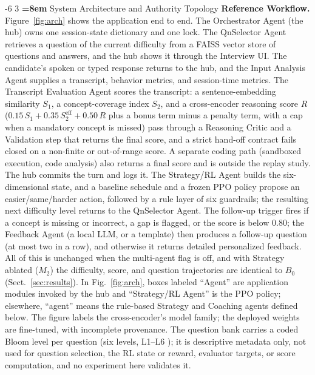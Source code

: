\documentclass[runningheads,a4paper]{llncs}
\makeatletter
\renewcommand\section{\@startsection{section}{1}{\z@}%
                       {-6\p@ \@plus -1\p@ \@minus -1\p@}%
                       {3\p@ \@plus 1\p@ \@minus 1\p@}%
                       {\normalfont\large\bfseries\boldmath
                        \rightskip=\z@ \@plus 8em\pretolerance=10000 }}
\makeatother
\begin{document}
\section{System Architecture and Authority Topology}
\textbf{Reference Workflow.} Figure~\ref{fig:arch} shows the application end to end. The Orchestrator Agent (the hub) owns one session-state dictionary and one lock. The QnSelector Agent retrieves a question of the current difficulty from a FAISS vector store of questions and answers, and the hub shows it through the Interview UI. The candidate's spoken or typed response returns to the hub, and the Input Analysis Agent supplies a transcript, behavior metrics, and session-time metrics. The Transcript Evaluation Agent scores the transcript: a sentence-embedding similarity $S_1$, a concept-coverage index $S_2$, and a cross-encoder reasoning score $R$ ($0.15\,S_1+0.35\,S_2^{\mathrm{eff}}+0.50\,R$ plus a bonus term minus a penalty term, with a cap when a mandatory concept is missed) pass through a Reasoning Critic and a Validation step that returns the final score, and a strict hand-off contract fails closed on a non-finite or out-of-range score. A separate coding path (sandboxed execution, code analysis) also returns a final score and is outside the replay study. The hub commits the turn and logs it. The Strategy/RL Agent builds the six-dimensional state, and a baseline schedule and a frozen PPO policy \cite{raffin2021,schulman2017} propose an easier/same/harder action, followed by a rule layer of six guardrails; the resulting next difficulty level returns to the QnSelector Agent. The follow-up trigger fires if a concept is missing or incorrect, a gap is flagged, or the score is below 0.80; the Feedback Agent (a local LLM, or a template) then produces a follow-up question (at most two in a row), and otherwise it returns detailed personalized feedback. All of this is unchanged when the multi-agent flag is off, and with Strategy ablated ($M_2$) the difficulty, score, and question trajectories are identical to $B_0$ (Sect.~\ref{sec:results}). In Fig.~\ref{fig:arch}, boxes labeled ``Agent'' are application modules invoked by the hub and ``Strategy/RL Agent'' is the PPO policy; elsewhere, ``agent'' means the rule-based Strategy and Coaching agents defined below. The figure labels the cross-encoder's model family; the deployed weights are fine-tuned, with incomplete provenance. The question bank carries a coded Bloom level per question (six levels, L1--L6 \cite{bloom1956,anderson2001}); it is descriptive metadata only, not used for question selection, the RL state or reward, evaluator targets, or score computation, and no experiment here validates it.
\end{document}
